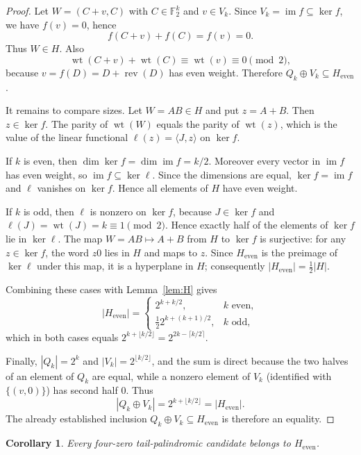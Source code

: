 \documentclass[11pt]{article}
\newtheorem{corollary}[theorem]{Corollary}
\theoremstyle{definition}
\theoremstyle{remark}
\begin{document}
\begin{proof}
Let $W=(C+v,C)$ with $C\in\mathbb F_2^k$ and $v\in V_k$. Since $V_k=\operatorname{im} f\subseteq\ker f$, we have $f(v)=0$, hence
\[
f(C+v)+f(C)=f(v)=0.
\]
Thus $W\in H$. Also
\[
\operatorname{wt}(C+v)+\operatorname{wt}(C)\equiv \operatorname{wt}(v)\equiv 0\pmod 2,
\]
because $v=f(D)=D+\operatorname{rev}(D)$ has even weight. Therefore $Q_k\oplus V_k\subseteq H_{\mathrm{even}}$.

It remains to compare sizes. Let $W=AB\in H$ and put $z=A+B$. Then $z\in\ker f$. The parity of $\operatorname{wt}(W)$ equals the parity of $\operatorname{wt}(z)$, which is the value of the linear functional $\ell(z)=\langle J,z\rangle$ on $\ker f$.

If $k$ is even, then $\dim\ker f=\dim\operatorname{im} f=k/2$. Moreover every vector in $\operatorname{im} f$ has even weight, so $\operatorname{im} f\subseteq \ker \ell$. Since the dimensions are equal, $\ker f=\operatorname{im} f$ and $\ell$ vanishes on $\ker f$. Hence all elements of $H$ have even weight.

If $k$ is odd, then $\ell$ is nonzero on $\ker f$, because $J\in\ker f$ and $\ell(J)=\operatorname{wt}(J)=k\equiv1\pmod2$. Hence exactly half of the elements of $\ker f$ lie in $\ker\ell$. The map $W=AB\mapsto A+B$ from $H$ to $\ker f$ is surjective: for any $z\in\ker f$, the word $z0$ lies in $H$ and maps to $z$. Since $H_{\mathrm{even}}$ is the preimage of $\ker\ell$ under this map, it is a hyperplane in $H$; consequently $|H_{\mathrm{even}}|=\frac12|H|$.

Combining these cases with Lemma~\ref{lem:H} gives
\[
|H_{\mathrm{even}}|=
\begin{cases}
2^{k+k/2},& k\text{ even},\\[2mm]
\frac12 2^{k+(k+1)/2},& k\text{ odd},
\end{cases}
\]
which in both cases equals $2^{k+\lfloor k/2\rfloor}=2^{2k-\lceil k/2\rceil}$.

Finally, $|Q_k|=2^k$ and $|V_k|=2^{\lfloor k/2\rfloor}$, and the sum is direct because the two halves of an element of $Q_k$ are equal, while a nonzero element of $V_k$ (identified with $\{(v,0)\}$) has second half $0$. Thus
\[
|Q_k\oplus V_k|=2^{k+\lfloor k/2\rfloor}=|H_{\mathrm{even}}|.
\]
The already established inclusion $Q_k\oplus V_k\subseteq H_{\mathrm{even}}$ is therefore an equality.
\end{proof}

\begin{corollary}\label{cor:fourzerotarget}
Every four-zero tail-palindromic candidate belongs to $H_{\mathrm{even}}$.
\end{corollary}
\end{document}

